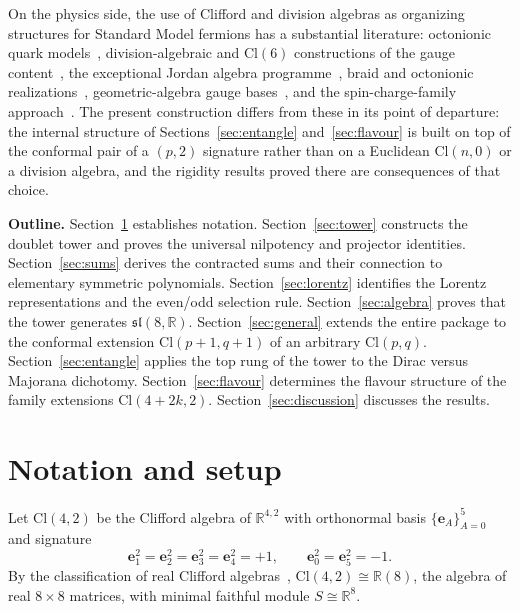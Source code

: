 \documentclass{birkjour}
\theoremstyle{definition}
\theoremstyle{remark}
\numberwithin{equation}{section}
\newcommand{\Cl}{\mathrm{Cl}}
\newcommand{\slR}{\mathfrak{sl}}
\newcommand{\e}[1]{\bm{e}_{#1}}
\newcommand{\R}{\mathbb{R}}
\providecommand{\rev}{{}}
\newenvironment{revblock}{}{}
\begin{document}
\begin{revblock}
On the physics side, the use of Clifford and division
algebras as organizing structures for Standard Model
fermions has a substantial
literature: octonionic quark
models~\cite{GunaydinGursey1973}, division-algebraic and
$\Cl(6)$ constructions of the gauge
content~\cite{Furey2018,Stoica2018,GordingSchmidtMay2020},
the exceptional Jordan algebra
programme~\cite{TodorovDV2018,Boyle2020}, braid and
octonionic realizations~\cite{Gresnigt2018,Krasnov2022},
geometric-algebra gauge bases~\cite{TraylingBaylis2001},
and the spin-charge-family
approach~\cite{MankocBorstnik1993}. The present
construction differs from these in its point of departure:
the internal structure of
Sections~\ref{sec:entangle} and~\ref{sec:flavour} is built
on top of the conformal pair of a $(p,2)$ signature rather
than on a Euclidean $\Cl(n,0)$ or a division algebra, and
the rigidity results proved there are consequences of that
choice.
\end{revblock}

\medskip
\noindent\textbf{Outline.}
Section~\ref{sec:setup} establishes notation.
Section~\ref{sec:tower} constructs the doublet tower and
proves the universal nilpotency and projector identities.
Section~\ref{sec:sums} derives the contracted sums and their
connection to elementary symmetric polynomials.
Section~\ref{sec:lorentz} identifies the Lorentz
representations and the even/odd selection rule.
Section~\ref{sec:algebra} proves that the tower generates
$\slR(8,\R)$.
\rev{Section~\ref{sec:general} extends the entire package to
the conformal extension $\Cl(p+1,q+1)$ of an arbitrary
$\Cl(p,q)$. Section~\ref{sec:entangle} applies the top rung
of the tower to the Dirac versus Majorana dichotomy.
Section~\ref{sec:flavour} determines the flavour structure
of the family extensions $\Cl(4+2k,2)$.}
Section~\ref{sec:discussion} discusses the results.


\section{Notation and setup}\label{sec:setup}

Let $\Cl(4,2)$ be the Clifford algebra of $\R^{4,2}$
with orthonormal basis $\{\e{A}\}_{A=0}^5$ and signature
\begin{equation}\label{eq:signature}
\e{1}^2=\e{2}^2=\e{3}^2=\e{4}^2=+1,
\qquad
\e{0}^2=\e{5}^2=-1.
\end{equation}
By the classification of real Clifford
algebras~\cite{Lounesto2001},
$\Cl(4,2)\cong\R(8)$, the algebra of real $8\times 8$ matrices,
with minimal faithful module $S\cong\R^8$.
\end{document}
